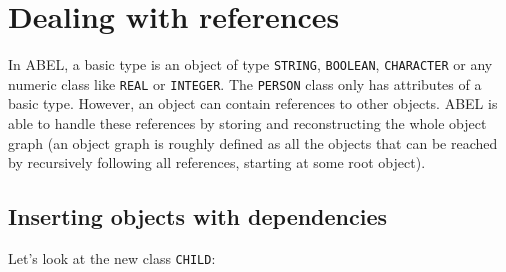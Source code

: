 \documentclass[a4paper,12pt]{report}
\begin{document}
%

\chapter{Dealing with references}
\label {chapter:references}

In ABEL, a basic type is an object of type \lstinline!STRING!, \lstinline!BOOLEAN!, \lstinline!CHARACTER! or any numeric class like \lstinline!REAL! or \lstinline!INTEGER!.
The \lstinline!PERSON! class only has attributes of a basic type. However, an object can contain references to other objects. ABEL is able to handle these references by storing and reconstructing the whole object graph (an object graph is roughly defined as all the objects that can be reached by recursively following all references, starting at some root object).

\section{Inserting objects with dependencies}
Let's look at the new class \lstinline!CHILD!:
\end{document}
